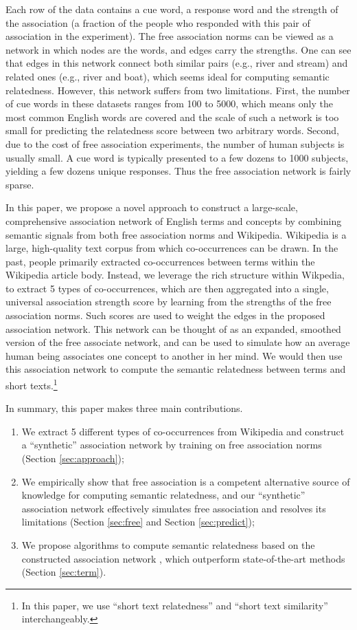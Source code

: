 \documentclass[letterpaper]{article}
\newcommand{\secref}[1]{Section \ref{#1}}
\begin{document}
Each row of the data contains a cue word, a response word and the
strength of the association (a fraction of the people who
responded with this pair of association in the experiment). 
The free association norms can be viewed as a network in which 
nodes are the words, and edges carry the strengths.
One can see that edges in this network connect both similar pairs
(e.g., river and stream) and related ones (e.g., river and boat), which
seems ideal for computing semantic relatedness. However, this network suffers from two limitations. First, the
number of cue words in these datasets ranges from 100 to 5000, 
which means only the most
common English words are covered and the scale of such a network is
too small for predicting the relatedness score between two arbitrary
words. Second, due to the cost of free association experiments, the
number of human subjects is usually small. A cue word is 
typically presented to a few dozens to 1000 subjects, yielding a few dozens
unique responses. 
Thus the free association network is fairly sparse.

In this paper, we propose a novel approach to construct a large-scale,
comprehensive association network of English terms and concepts by
combining semantic signals
from both free association norms and Wikipedia.
Wikipedia is a large, high-quality text corpus from which
co-occurrences can be drawn. In the past, people primarily extracted
co-occurrences between terms within the Wikipedia article body.
Instead, we leverage the rich structure within Wikpedia, to
extract 5 types of co-occurrences, which are then
aggregated into a single, universal association strength score by
learning from the strengths of the free association norms. Such
scores are used to weight the edges in the proposed association
network. This network can be thought of as an expanded, smoothed
version of the free associate network, and can be used to simulate how
an average human being associates one concept to another in her
mind. We would then use this association network to compute the
semantic relatedness between terms and short texts.\footnote{In this paper,
we use ``short text relatedness'' and ``short text similarity'' interchangeably.}

In summary, this paper makes three main contributions.
\begin{enumerate}
\item We extract 5 different types of co-occurrences
from Wikipedia and construct a ``synthetic''
association network by training on free association norms (\secref{sec:approach});
\item We empirically show that free association is a
competent alternative source of knowledge for computing semantic
relatedness, and our ``synthetic'' association network 
effectively simulates free association and resolves its limitations (\secref{sec:free} and 
\secref{sec:predict});
\item We propose algorithms to compute semantic relatedness based on the constructed association network
, which outperform state-of-the-art methods
(\secref{sec:term}).
\end{enumerate}
\end{document}
